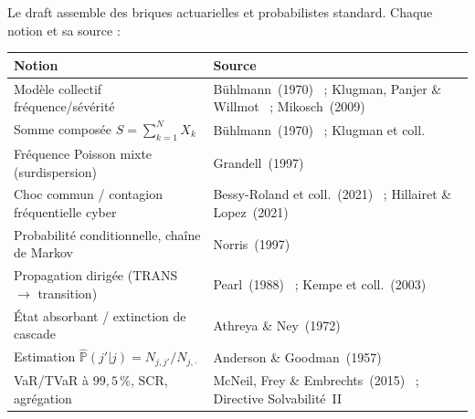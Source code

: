\documentclass[11pt,a4paper]{article}
\begin{document}
Le draft assemble des briques actuarielles et probabilistes standard. Chaque notion et sa source :

\begin{table}[h]\centering\small
\renewcommand{\arraystretch}{1.3}
\begin{tabular}{@{}p{6.6cm} p{6.6cm}@{}}
\toprule
\textbf{Notion} & \textbf{Source} \\
\midrule
Modèle collectif fréquence/sévérité & Bühlmann~(1970)~\cite{Buhlmann1970} ; Klugman, Panjer \& Willmot~\cite{KlugmanPanjerWillmot} ; Mikosch~(2009)~\cite{Mikosch2009} \\
Somme composée $S=\sum_{k=1}^{N} X_k$ & Bühlmann~(1970)~\cite{Buhlmann1970} ; Klugman et coll.~\cite{KlugmanPanjerWillmot} \\
Fréquence Poisson mixte (surdispersion) & Grandell~(1997)~\cite{Grandell1997} \\
Choc commun / contagion fréquentielle cyber & Bessy-Roland et coll.~(2021)~\cite{BessyRolandBoumezouedHillairet2021} ; Hillairet \& Lopez~(2021)~\cite{HillairetLopez2021} \\
Probabilité conditionnelle, chaîne de Markov & Norris~(1997)~\cite{Norris1997} \\
Propagation dirigée (TRANS $\to$ transition) & Pearl~(1988)~\cite{Pearl1988} ; Kempe et coll.~(2003)~\cite{Kempe2003} \\
État absorbant / extinction de cascade & Athreya \& Ney~(1972)~\cite{AthreyaNey1972} \\
Estimation $\widehat{\mathbb P}(j'|j)=N_{j,j'}/N_{j,\cdot}$ & Anderson \& Goodman~(1957)~\cite{AndersonGoodman1957} \\
VaR/TVaR à $99{,}5\,\%$, SCR, agrégation & McNeil, Frey \& Embrechts~(2015)~\cite{mcneil2015} ; Directive Solvabilité~II~\cite{SolvencyII2009} \\
\bottomrule
\end{tabular}
\end{table}
\end{document}
